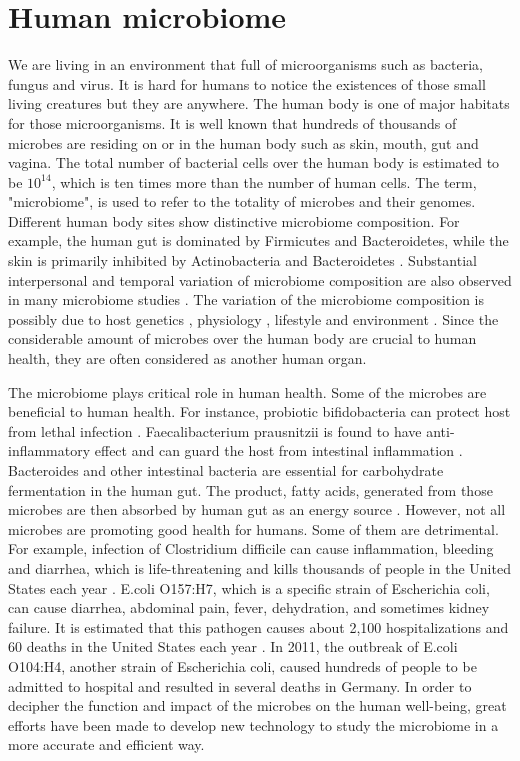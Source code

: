  \label{chpt:intro}

\section{Human microbiome}
We are living in an environment that full of microorganisms such as bacteria, fungus and virus. It is hard for humans to notice the existences of those small living creatures but they are anywhere.  The human body is one of major habitats for those microorganisms. It is well known that hundreds of thousands of microbes are residing on or in the human body such as skin, mouth, gut and vagina. The total number of bacterial cells over the human body is estimated to be $10^{14}$, which is ten times more than the number of human cells. The term, "microbiome", is used to refer to the totality of microbes and their genomes. Different human body sites show distinctive microbiome composition. For example, the human gut is dominated by Firmicutes and Bacteroidetes, while the skin is primarily inhibited by Actinobacteria and Bacteroidetes \citep{Cho:2012cn}. Substantial interpersonal and temporal variation of microbiome composition are also observed in many microbiome studies \citep{turnbaugh2007human}. The variation of the microbiome composition is possibly due to host genetics \citep{Knights:2014jta}, physiology \citep{Sommer:2013hq}, lifestyle \citep{wu2011linking} and environment \citep{Adams:2015ga}. Since the considerable amount of microbes over the human body are crucial to human health, they are often considered as another human organ.

The microbiome plays critical role in human health. Some of the microbes are beneficial to human health. For instance, probiotic bifidobacteria can protect host from lethal infection \citep{Fukuda:2012hg}. Faecalibacterium prausnitzii is found to have anti-inflammatory effect and can guard the host from intestinal inflammation \citep{Sokol:2008ke}. Bacteroides and other intestinal bacteria are essential for carbohydrate fermentation in the human gut. The product, fatty acids, generated from those microbes are then absorbed by human gut as an energy source \citep{Wexler:2007cn}. However, not all microbes are promoting good health for humans. Some of them are detrimental. For example, infection of Clostridium difficile can cause inflammation, bleeding and diarrhea, which is life-threatening and kills thousands of people in the United States each year \citep{Lessa:2015wl}. E.coli O157:H7, which is a specific strain of Escherichia coli, can cause diarrhea, abdominal pain, fever, dehydration, and sometimes kidney failure. It is estimated that this pathogen causes about 2,100 hospitalizations and 60 deaths in the United States each year \citep{Berkenpas:2006wl}. In 2011, the outbreak of  E.coli O104:H4, another strain of Escherichia coli,  caused hundreds of people to be admitted to hospital and resulted in several deaths in Germany. In order to decipher the function and impact of the microbes on the human well-being, great efforts have been made to develop new technology to study the microbiome in a more accurate and efficient way.


